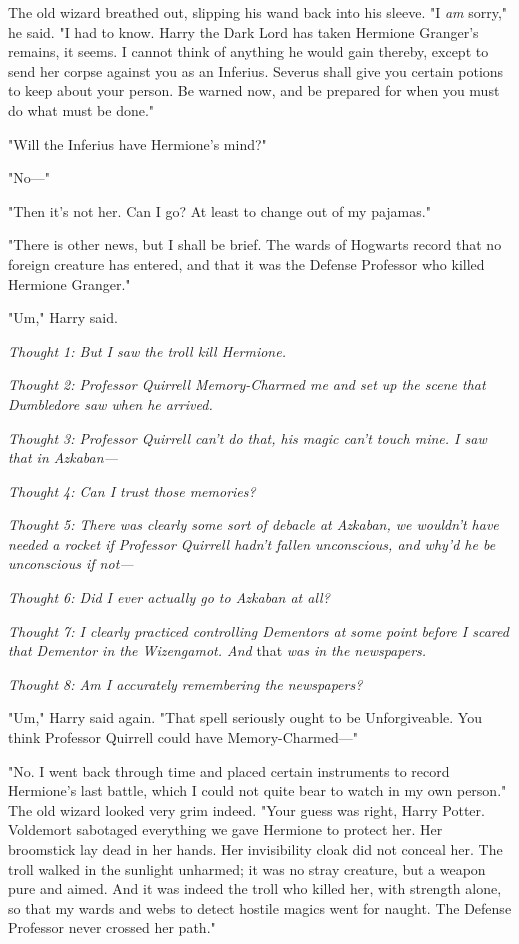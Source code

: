 The old wizard breathed out, slipping his wand back into his sleeve. "I
\emph{am} sorry," he said. "I had to know. Harry{\el} the Dark Lord has
taken Hermione Granger's remains, it seems. I cannot think of anything he would
gain thereby, except to send her corpse against you as an Inferius. Severus
shall give you certain potions to keep about your person. Be warned now, and be
prepared for when you must do what must be done."

"Will the Inferius have Hermione's mind?"

"No\mbox{---}"

"Then it's not her. Can I go? At least to change out of my pajamas."

"There is other news, but I shall be brief. The wards of Hogwarts record that
no foreign creature has entered, and that it was the Defense Professor who
killed Hermione Granger."

"Um," Harry said.

\emph{Thought 1: But I saw the troll kill Hermione.}

\emph{Thought 2: Professor Quirrell Memory-Charmed me and set up the scene that
Dumbledore saw when he arrived.}

\emph{Thought 3: Professor Quirrell can't do that, his magic can't touch mine.
I saw that in Azkaban---}

\emph{Thought 4: Can I trust those memories?}

\emph{Thought 5: There was clearly some sort of debacle at Azkaban, we wouldn't
have needed a rocket if Professor Quirrell hadn't fallen unconscious, and why'd
he be unconscious if not---}

\emph{Thought 6: Did I ever actually go to Azkaban at all?}

\emph{Thought 7: I clearly practiced controlling Dementors at some point before
I scared that Dementor in the Wizengamot. And} that \emph{was in the
newspapers.}

\emph{Thought 8: Am I accurately remembering the newspapers?}

"Um," Harry said again. "That spell seriously ought to be Unforgiveable. You
think Professor Quirrell could have Memory-Charmed\mbox{---}"

"No. I went back through time and placed certain instruments to record
Hermione's last battle, which I could not quite bear to watch in my own
person." The old wizard looked very grim indeed. "Your guess was right, Harry
Potter. Voldemort sabotaged everything we gave Hermione to protect her. Her
broomstick lay dead in her hands. Her invisibility cloak did not conceal her.
The troll walked in the sunlight unharmed; it was no stray creature, but a
weapon pure and aimed. And it was indeed the troll who killed her, with
strength alone, so that my wards and webs to detect hostile magics went for
naught. The Defense Professor never crossed her path."

